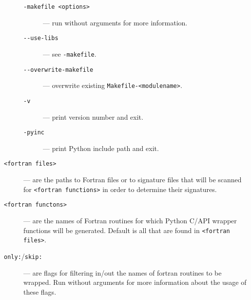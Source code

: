 \begin{description}
\begin{description}
  \item[\texttt{-makefile <options>}] --- run \fpy without arguments
    for more information.
  \item[\texttt{-{}-use-libs}] --- see \texttt{-makefile}.
  \item[\texttt{-{}-overwrite-makefile}] --- overwrite existing
    \texttt{Makefile-<modulename>}.
  \item[\texttt{-v}] --- print \fpy version number and exit.
  \item[\texttt{-pyinc}] --- print Python include path and exit.
  \end{description}
\item[\texttt{<fortran files>}] --- are the paths to Fortran files or
  to signature files that will be scanned for \texttt{<fortran
    functions>} in order to determine their signatures.
\item[\texttt{<fortran functons>}] --- are the names of Fortran
  routines for which Python C/API wrapper functions will be generated.
  Default is all that are found in \texttt{<fortran files>}.
\item[\texttt{only:}/\texttt{skip:}] --- are flags for filtering
  in/out the names of fortran routines to be wrapped. Run \fpy without
  arguments for more information about the usage of these flags.
\end{description}


